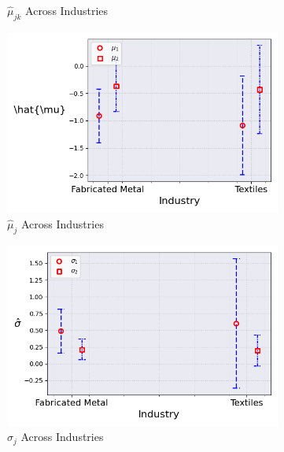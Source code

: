 \documentclass{article}
\begin{document}
\begin{figure}[ht!]
\begin{subfigure}[t]{0.32\textwidth}
        \caption{$\hat\mu_{jk}$ Across Industries}
    \end{subfigure}
    \begin{subfigure}[t]{0.32\textwidth}
        \centering
        \includegraphics[width=\textwidth]{figure/ar1_mixture_kmshare_ciiu_mubar_across_industries_m2.png}
        \caption{$\hat{\mu}_j$ Across Industries}
    \end{subfigure}
    \begin{subfigure}[t]{0.32\textwidth}
        \centering
        \includegraphics[width=\textwidth]{figure/ar1_mixture_kmshare_ciiu_sigma_across_industries_m2.png}
        \caption{$\hat\sigma_j$ Across Industries}
    \end{subfigure}
    \begin{subfigure}[t]{0.32\textwidth}
        \centering

\end{subfigure}
\end{figure}
\end{document}
